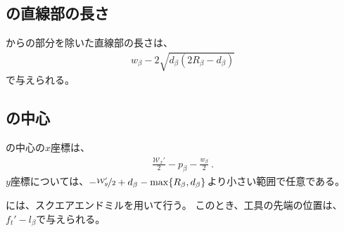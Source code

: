\subsection{\EndFaceBoringWidth の直線部の長さ}
\EndFaceBoringWidth から\EndFaceBoringCornerR の部分を除いた直線部の長さは、
\begin{align*}
  w_\beta-2\sqrt{d_\beta(2R_\beta-d_\beta)}
\end{align*}
で与えられる。


\clearpage
\subsection{\EndFaceBoring の中心}
\EndFaceBoringWidth の中心の$x$座標は、
\begin{align*}
  \frac{\mathcal W_x'}2-p_\beta-\frac{w_\beta}2\ .
\end{align*}
$y$座標については、$-\nicefrac{\mathcal W_y'}2+d_\beta-\max\{R_\beta, d_\beta\}$より小さい範囲で任意である。



\EndFaceBoringMilling には、スクエアエンドミルを用いて行う。
このとき、工具の先端の位置は、$f_t'-l_\beta$で与えられる。
